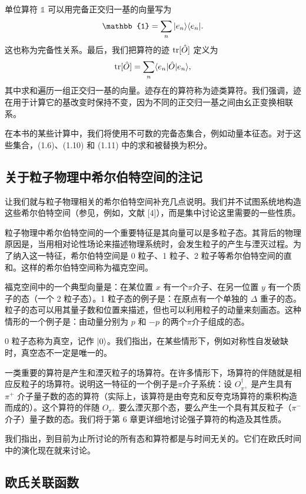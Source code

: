 单位算符 $\mathbb{1}$ 可以用完备正交归一基的向量写为
\begin{equation}
  \mathbb{1} = \sum_n \ket{e_n}\bra{e_n}.
\end{equation}
这也称为完备性关系。最后，我们把算符的迹 $\operatorname{tr}[\hat{O}]$ 定义为
\begin{equation}
  \operatorname{tr}[\hat{O}] = \sum_n \langle e_n|\hat{O}|e_n\rangle,
\end{equation}
其中求和遍历一组正交归一基的向量。迹存在的算符称为迹类算符。我们强调，迹在用于计算它的基改变时保持不变，因为不同的正交归一基之间由幺正变换相联系。

在本书的某些计算中，我们将使用不可数的完备态集合，例如动量本征态。对于这些集合，(1.6)、(1.10) 和 (1.11) 中的求和被替换为积分。

\subsection{关于粒子物理中希尔伯特空间的注记}

让我们就与粒子物理相关的希尔伯特空间补充几点说明。我们并不试图系统地构造这些希尔伯特空间（参见，例如，文献 [4]），而是集中讨论这里需要的一些性质。

粒子物理中希尔伯特空间的一个重要特征是其向量可以是多粒子态。其背后的物理原因是，当用相对论性场论来描述物理系统时，会发生粒子的产生与湮灭过程。为了纳入这一特征，希尔伯特空间是 0 粒子、1 粒子、2 粒子等希尔伯特空间的直和。这样的希尔伯特空间称为福克空间。

福克空间中的一个典型向量是：在某位置 $x$ 有一个$\pi$介子、在另一位置 $y$ 有一个质子的态（一个 2 粒子态）。1 粒子态的例子是：在原点有一个单独的 $\Delta$ 重子的态。粒子的态可以用其量子数和位置来描述，但也可以利用粒子的动量来刻画态。这种情形的一个例子是：由动量分别为 $p$ 和 $-p$ 的两个$\pi$介子组成的态。

0 粒子态称为真空，记作 $|0\rangle$。我们指出，在某些情形下，例如对称性自发破缺时，真空态不一定是唯一的。

一类重要的算符是产生和湮灭粒子的场算符。在许多情形下，场算符的伴随就是相应反粒子的场算符。说明这一特征的一个例子是$\pi$介子系统：设 $O_{\pi^+}^\dagger$ 是产生具有 $\pi^+$ 介子量子数的态的算符（实际上，该算符是由夸克和反夸克场算符的乘积构造而成的）。这个算符的伴随 $O_{\pi^+}$ 要么湮灭那个态，要么产生一个具有其反粒子（$\pi^-$ 介子）量子数的态。我们将于第 6 章更详细地讨论强子算符的构造及其性质。

我们指出，到目前为止所讨论的所有态和算符都是与时间无关的。它们在欧氏时间中的演化现在就来讨论。

\subsection{欧氏关联函数}

